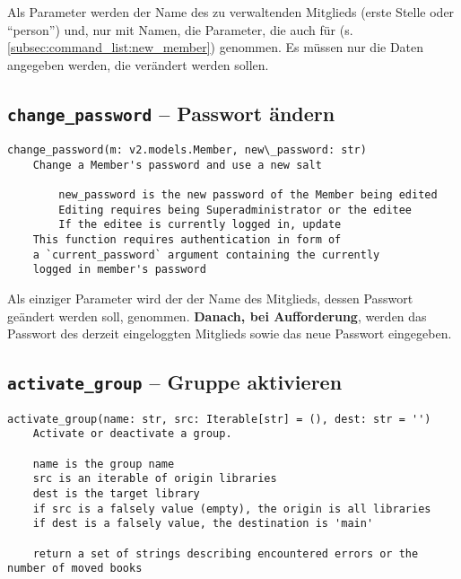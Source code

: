 Als Parameter werden der Name des zu verwaltenden Mitglieds (erste Stelle oder ``person'') und, nur mit Namen, die Parameter, die auch für  (s. \ref{subsec:command_list:new_member}) genommen. Es müssen nur die Daten angegeben werden, die verändert werden sollen.



\subsection{\texttt{change\_password} -- Passwort ändern}
\label{subsec:command_list:change_password}

\begin{verbatim}
change_password(m: v2.models.Member, new\_password: str)
    Change a Member's password and use a new salt

        new_password is the new password of the Member being edited
        Editing requires being Superadministrator or the editee
        If the editee is currently logged in, update
    This function requires authentication in form of
    a `current_password` argument containing the currently
    logged in member's password
\end{verbatim}

Als einziger Parameter wird der der Name des Mitglieds, dessen Passwort geändert werden soll, genommen. \textbf{Danach, bei Aufforderung}, werden das Passwort des derzeit eingeloggten Mitglieds sowie das neue Passwort eingegeben.

\subsection{\texttt{activate\_group} -- Gruppe aktivieren}
\label{subsec:command_list:activate_group}

\begin{verbatim}
activate_group(name: str, src: Iterable[str] = (), dest: str = '')
    Activate or deactivate a group.

    name is the group name
    src is an iterable of origin libraries
    dest is the target library
    if src is a falsely value (empty), the origin is all libraries
    if dest is a falsely value, the destination is 'main'

    return a set of strings describing encountered errors or the number of moved books
\end{verbatim}

